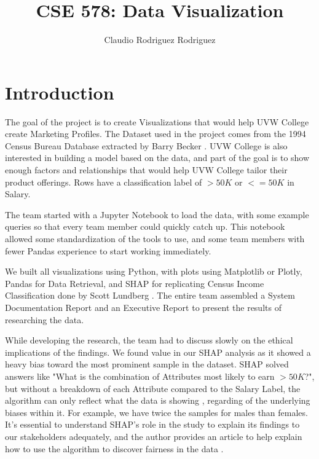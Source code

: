 \documentclass{IEEEtran}
\begin{document}
\title{CSE 578: Data Visualization}
\author{Claudio Rodriguez Rodriguez}
\maketitle

\section{Introduction}

The goal of the project is to create Visualizations that would help UVW College create Marketing Profiles. The Dataset used in the project comes from the 1994 Census Bureau Database extracted by Barry Becker \cite{cse578:kohaviNbtree}. UVW College is also interested in building a model based on the data, and part of the goal is to show enough factors and relationships that would help UVW College tailor their product offerings. Rows have a classification label of $>50K$ or $<=50K$ in Salary.  

The team started with a Jupyter Notebook to load the data, with some example queries so that every team member could quickly catch up. This notebook allowed some standardization of the tools to use, and some team members with fewer Pandas experience to start working immediately.

We built all visualizations using Python, with plots using Matplotlib or Plotly, Pandas for Data Retrieval, and SHAP for replicating Census Income Classification done by Scott Lundberg \cite{cse578:censusIncomeClassificationLightgbm}. The entire team assembled a System Documentation Report and an Executive Report to present the results of researching the data. 

While developing the research, the team had to discuss slowly on the ethical implications of the findings. We found value in our SHAP analysis as it showed a heavy bias toward the most prominent sample in the dataset. SHAP solved answers like "What is the combination of Attributes most likely to earn $>50K$?", but without a breakdown of each Attribute compared to the Salary Label, the algorithm can only reflect what the data is showing \cite{slack2019fooling}, regarding of the underlying biases within it. For example, we have twice the samples for males than females. It's essential to understand SHAP's role in the study to explain its findings to our stakeholders adequately, and the author provides an article to help explain how to use the algorithm to discover fairness in the data \cite{ExplainingMeasuresofFairnessAvoidt}. 
\end{document}
